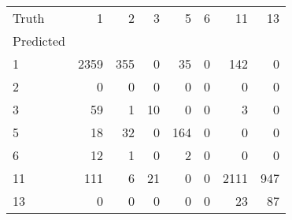\begin{tabular}{lrrrrrrr}
\toprule
Truth & 1 & 2 & 3 & 5 & 6 & 11 & 13 \\
Predicted &  &  &  &  &  &  &  \\
\midrule
1 & 2359 & 355 & 0 & 35 & 0 & 142 & 0 \\
2 & 0 & 0 & 0 & 0 & 0 & 0 & 0 \\
3 & 59 & 1 & 10 & 0 & 0 & 3 & 0 \\
5 & 18 & 32 & 0 & 164 & 0 & 0 & 0 \\
6 & 12 & 1 & 0 & 2 & 0 & 0 & 0 \\
11 & 111 & 6 & 21 & 0 & 0 & 2111 & 947 \\
13 & 0 & 0 & 0 & 0 & 0 & 23 & 87 \\
\bottomrule
\end{tabular}

